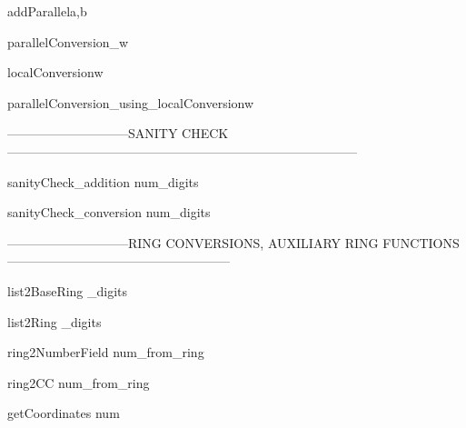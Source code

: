 \begin{method}{addParallel}{a,b}

\end{method}


\begin{method}{parallelConversion}{\_w}

\end{method}


\begin{method}{localConversion}{w}

\end{method}


\begin{method}{parallelConversion\_using\_localConversion}{w}

\end{method}


-----------------------------SANITY CHECK-----------------------------------------------------------------------------------

\begin{method}{sanityCheck\_addition}{ num\_digits}

\end{method}


\begin{method}{sanityCheck\_conversion}{ num\_digits}

\end{method}


-----------------------------RING CONVERSIONS, AUXILIARY RING FUNCTIONS-----------------------------------------------------

\begin{method}{list2BaseRing}{ \_digits}

\end{method}


\begin{method}{list2Ring}{ \_digits}

\end{method}


\begin{method}{ring2NumberField}{ num\_from\_ring}

\end{method}


\begin{method}{ring2CC}{ num\_from\_ring}

\end{method}


\begin{method}{getCoordinates}{ num}

\end{method}


